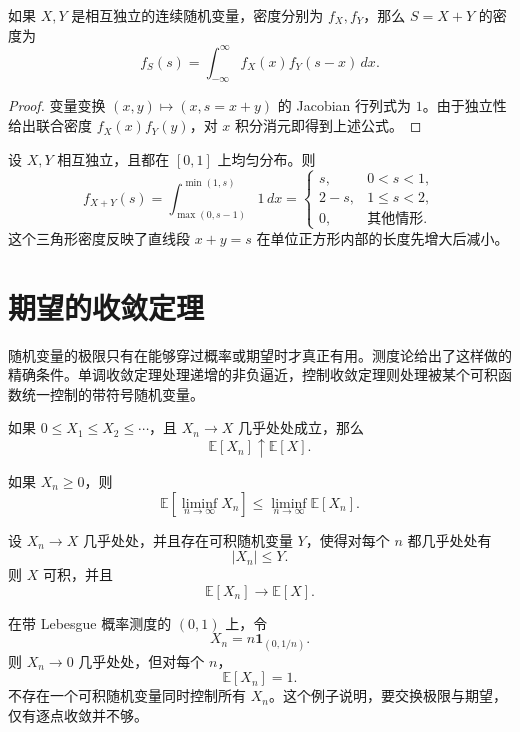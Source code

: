 \begin{theorem}[卷积公式]
如果 $X,Y$ 是相互独立的连续随机变量，密度分别为 $f_X,f_Y$，那么 $S=X+Y$ 的密度为
\[
    f_S(s)=\int_{-\infty}^{\infty}f_X(x)f_Y(s-x)\,dx.
\]
\end{theorem}

\begin{proof}
变量变换 $(x,y)\mapsto(x,s=x+y)$ 的 Jacobian 行列式为 $1$。由于独立性给出联合密度 $f_X(x)f_Y(y)$，对 $x$ 积分消元即得到上述公式。
\end{proof}

\begin{example}[两个均匀随机变量之和]
设 $X,Y$ 相互独立，且都在 $[0,1]$ 上均匀分布。则
\[
    f_{X+Y}(s)
    =\int_{\max(0,s-1)}^{\min(1,s)}1\,dx
    =
    \begin{cases}
    s,&0<s<1,\\
    2-s,&1\leq s<2,\\
    0,&\text{其他情形}.
    \end{cases}
\]
这个三角形密度反映了直线段 $x+y=s$ 在单位正方形内部的长度先增大后减小。
\end{example}

\section{期望的收敛定理}

随机变量的极限只有在能够穿过概率或期望时才真正有用。测度论给出了这样做的精确条件。单调收敛定理处理递增的非负逼近，控制收敛定理则处理被某个可积函数统一控制的带符号随机变量。

\begin{theorem}[单调收敛定理]
如果 $0\leq X_1\leq X_2\leq\cdots$，且 $X_n\to X$ 几乎处处成立，那么
\[
    \mathbb{E}[X_n]\uparrow\mathbb{E}[X].
\]
\end{theorem}

\begin{theorem}[Fatou 引理]
如果 $X_n\geq0$，则
\[
    \mathbb{E}\left[\liminf_{n\to\infty}X_n\right]
    \leq
    \liminf_{n\to\infty}\mathbb{E}[X_n].
\]
\end{theorem}

\begin{theorem}[控制收敛定理]
设 $X_n\to X$ 几乎处处，并且存在可积随机变量 $Y$，使得对每个 $n$ 都几乎处处有
\[
    |X_n|\leq Y.
\]
则 $X$ 可积，并且
\[
    \mathbb{E}[X_n]\to\mathbb{E}[X].
\]
\end{theorem}

\begin{example}[为什么逐点收敛还不够]
在带 Lebesgue 概率测度的 $(0,1)$ 上，令
\[
    X_n=n\mathbf{1}_{(0,1/n)}.
\]
则 $X_n\to0$ 几乎处处，但对每个 $n$，
\[
    \mathbb{E}[X_n]=1.
\]
不存在一个可积随机变量同时控制所有 $X_n$。这个例子说明，要交换极限与期望，仅有逐点收敛并不够。
\end{example}

